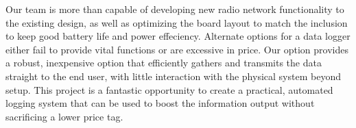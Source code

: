 \documentclass[12pt]{article}
\begin{document}
Our team is more than capable of developing new radio network functionality to the existing design, as well as optimizing the board layout to match the inclusion to keep good battery life and power effeciency.  Alternate options for a data logger either fail to provide vital functions or are excessive in price.  Our option provides a robust, inexpensive option that efficiently gathers and transmits the data straight to the end user, with little interaction with the physical system beyond setup.  This project is a fantastic opportunity to create a practical, automated logging system that can be used to boost the information output without sacrificing a lower price tag.
\end{document}
